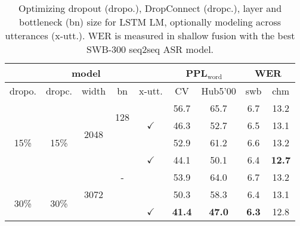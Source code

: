 \documentclass[a4paper]{article}
\begin{document}
\begin{table}
  \centering
  \caption{Optimizing dropout (dropo.), DropConnect (dropc.), layer and bottleneck (bn) size for LSTM LM, optionally modeling across utterances (x-utt.). WER is measured in shallow fusion with the best SWB-300 seq2seq ASR model.}
\vspace{-3mm}
  \begin{tabular}{|@{}c@{}|@{}c@{}|@{}c@{}|@{}c@{}|@{}c@{}|@{}c@{}|@{}c@{}|@{}c@{}|@{}c@{}|}
\hline
 \multicolumn{5}{|c|}{model}               & \multicolumn{2}{c|}{PPL$_{\text{word}}$} & \multicolumn{2}{c|}{WER} \\
\hline
 \hspace{1mm}dropo.\hspace{1mm} & \hspace{1mm}dropc.\hspace{1mm} & \hspace{1mm}width\hspace{1mm}  & \hspace{1.5mm}bn\hspace{1.5mm}  &  x-utt. & \hspace{1.5mm}CV\hspace{1.5mm}   & \hspace{1mm}Hub5'00\hspace{1mm} & \hspace{1mm}swb\hspace{1mm} & \hspace{1mm}chm\hspace{1mm}  \\
\hline
\multirow{5}{*}{15\%} & \multirow{5}{*}{15\%} & \multirow{4}{*}{2048}  & \multirow{2}{*}{128} &          & 56.7 & 65.7 & 6.7 & 13.2 \\ \cline{5-9}
          &            &        &     & $\checkmark$ & 46.3 & 52.7 & 6.5 & 13.1 \\ \cline{4-9}
          &            &        & \multirow{5}{*}{-}  &          & 52.9 & 61.2 & 6.6 & 13.2  \\  \cline{5-9}
          &            &        &     & $\checkmark$ & 44.1 &  50.1 & 6.4 & {\bf 12.7} \\ \cline{3-3}\cline{5-9}
          &            & \multirow{3}{*}{3072} &     &          & 53.9 & 64.0 &  6.7   & 13.2     \\ \cline{1-2}\cline{6-9}
 \multirow{2}{*}{30\%} & \multirow{2}{*}{30\%} &  &   &          & 50.3 & 58.3 &  6.4   & 13.1     \\ \cline{5-9}
                       &                       &  &   & $\checkmark$ & {\bf 41.4} & {\bf 47.0}  & {\bf 6.3} & 12.8 \\
\hline
\end{tabular}
\label{tab:lmopt}
\vspace{-3mm}
\end{table}
\end{document}
